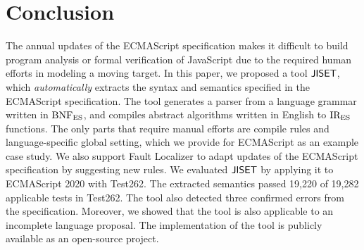 \section{Conclusion}\label{sec:conclude}
The annual updates of the ECMAScript specification makes it difficult to
build program analysis or formal verification of JavaScript due to the
required human efforts in modeling a moving target.  In this paper,
we proposed a tool \( \text{\sf JISET} \), which \textit{automatically} extracts the
syntax and semantics specified in the ECMAScript specification.  The tool
generates a parser from a language grammar written in \( \text{BNF}_{\text{ES}} \), and
compiles abstract algorithms written in English to \( \text{IR}_\text{ES} \) functions.
The only parts that require manual efforts are compile rules and
language-specific global setting, which we provide for ECMAScript
as an example case study.  We also support \textsf{Fault Localizer} to
adapt updates of the ECMAScript specification by suggesting new rules.
We evaluated \( \text{\sf JISET} \) by applying it to ECMAScript 2020 with Test262.
The extracted semantics passed 19,220 of 19,282 applicable tests in Test262.
The tool also detected three confirmed errors from the specification.
Moreover, we showed that the tool is also applicable to an incomplete
language proposal. The implementation of the tool is publicly available
as an open-source project.
